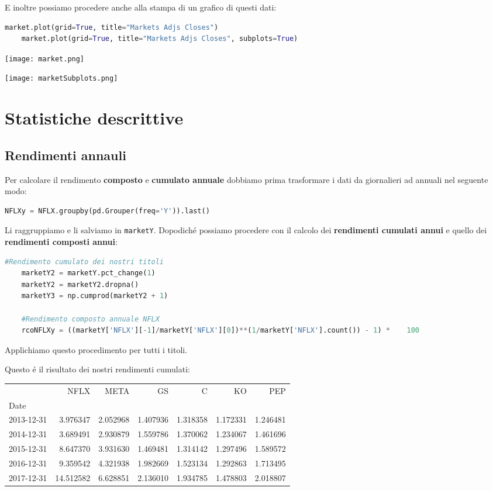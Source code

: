 \documentclass{report}
\begin{document}
E inoltre possiamo procedere anche alla stampa di un grafico di questi dati:
\begin{lstlisting}[language=python]
    market.plot(grid=True, title="Markets Adjs Closes")
    market.plot(grid=True, title="Markets Adjs Closes", subplots=True)
\end{lstlisting}

\texttt{[image: market.png]}

\texttt{[image: marketSubplots.png]}

\chapter{Statistiche descrittive}
\section{Rendimenti annauli}
Per calcolare il rendimento \textbf{composto} e \textbf{cumulato annuale} dobbiamo prima trasformare i dati da giornalieri ad annuali nel seguente modo:
\begin{lstlisting}[language=python]
    NFLXy = NFLX.groupby(pd.Grouper(freq='Y')).last()
\end{lstlisting}
Li raggruppiamo e li salviamo in \lstinline{marketY}.
Dopodiché possiamo procedere con il calcolo dei \textbf{rendimenti cumulati annui} e quello dei \textbf{rendimenti composti annui}:
\begin{lstlisting}[language=python]
    #Rendimento cumulato dei nostri titoli
    marketY2 = marketY.pct_change(1)
    marketY2 = marketY2.dropna()
    marketY3 = np.cumprod(marketY2 + 1)

    #Rendimento composto annuale NFLX
    rcoNFLXy = ((marketY['NFLX'][-1]/marketY['NFLX'][0])**(1/marketY['NFLX'].count()) - 1) *    100
\end{lstlisting}
Applichiamo questo procedimento per tutti i titoli.

\noindent Questo é il risultato dei nostri rendimenti cumulati:

\begin{tabular}{lrrrrrr}
\toprule
{} &       NFLX &      META &        GS &         C &        KO &       PEP \\
Date       &            &           &           &           &           &           \\
\midrule
2013-12-31 &   3.976347 &  2.052968 &  1.407936 &  1.318358 &  1.172331 &  1.246481 \\
2014-12-31 &   3.689491 &  2.930879 &  1.559786 &  1.370062 &  1.234067 &  1.461696 \\
2015-12-31 &   8.647370 &  3.931630 &  1.469481 &  1.314142 &  1.297496 &  1.589572 \\
2016-12-31 &   9.359542 &  4.321938 &  1.982669 &  1.523134 &  1.292863 &  1.713495 \\
2017-12-31 &  14.512582 &  6.628851 &  2.136010 &  1.934785 &  1.478803 &  2.018807 \\
\bottomrule
\end{tabular}
\end{document}
